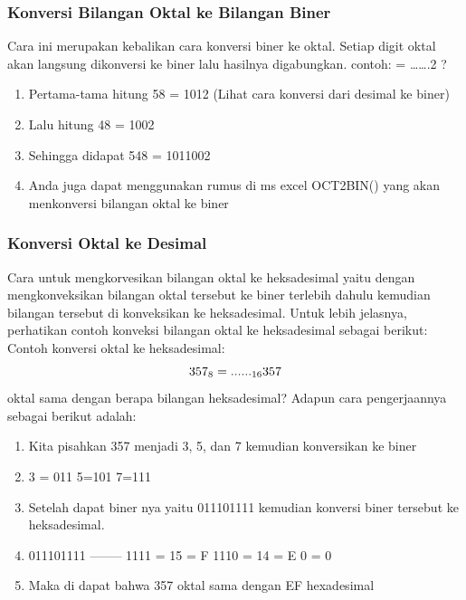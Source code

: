 \subsubsection{Konversi Bilangan Oktal ke Bilangan Biner}
Cara ini merupakan kebalikan cara konversi biner ke oktal. Setiap digit oktal akan langsung dikonversi ke biner lalu hasilnya digabungkan.
\break contoh:
 = …….2 ?
\break 
\begin{enumerate}
\item Pertama-tama hitung 58 = 1012 (Lihat cara konversi dari desimal ke biner)
\item Lalu hitung 48 = 1002
\item Sehingga didapat 548 = 1011002
\item Anda juga dapat menggunakan rumus di ms excel OCT2BIN() yang akan menkonversi bilangan oktal ke biner
\end{enumerate}

\subsubsection{Konversi Oktal ke Desimal}
Cara untuk mengkorvesikan bilangan oktal ke heksadesimal yaitu dengan mengkonveksikan bilangan oktal tersebut ke biner terlebih dahulu kemudian bilangan tersebut di konveksikan ke heksadesimal. Untuk lebih jelasnya, perhatikan contoh konveksi bilangan oktal ke heksadesimal sebagai berikut:
\break  Contoh konversi oktal ke heksadesimal:
\begin{equation}
\break 357_{8}=......_{16} 357 \end{equation}oktal sama dengan berapa bilangan heksadesimal?
Adapun cara pengerjaannya sebagai berikut adalah:
\begin{enumerate}
\item Kita pisahkan 357 menjadi 3, 5, dan 7 kemudian konversikan ke biner 
\item 3 = 011 5=101 7=111
\item Setelah dapat biner nya yaitu 011101111 kemudian konversi biner tersebut ke heksadesimal. 
\item 011101111 -------- 1111 = 15 = F 1110 = 14 = E 0 = 0
\item Maka di dapat bahwa 357 oktal sama dengan EF hexadesimal 
\end{enumerate}

